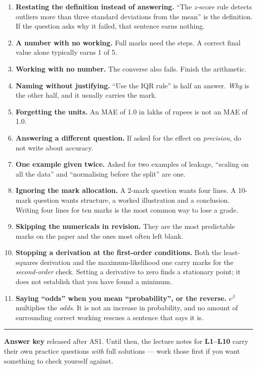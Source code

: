 \documentclass[11pt,a4paper]{article}
\begin{document}
\begin{enumerate}[leftmargin=*, itemsep=0.3em]
\item \textbf{Restating the definition instead of answering.} ``The $z$-score
  rule detects outliers more than three standard deviations from the mean'' is
  the definition. If the question asks why it failed, that sentence earns
  nothing.
\item \textbf{A number with no working.} Full marks need the steps. A correct
  final value alone typically earns 1 of 5.
\item \textbf{Working with no number.} The converse also fails. Finish the
  arithmetic.
\item \textbf{Naming without justifying.} ``Use the IQR rule'' is half an
  answer. \emph{Why} is the other half, and it usually carries the mark.
\item \textbf{Forgetting the units.} An MAE of 1.0 in lakhs of rupees is not an
  MAE of 1.0.
\item \textbf{Answering a different question.} If asked for the effect on
  \emph{precision}, do not write about accuracy.
\item \textbf{One example given twice.} Asked for two examples of leakage,
  ``scaling on all the data'' and ``normalising before the split'' are one.
\item \textbf{Ignoring the mark allocation.} A 2-mark question wants four lines.
  A 10-mark question wants structure, a worked illustration and a conclusion.
  Writing four lines for ten marks is the most common way to lose a grade.
\item \textbf{Skipping the numericals in revision.} They are the most
  predictable marks on the paper and the ones most often left blank.
\item \textbf{Stopping a derivation at the first-order conditions.} Both the
  least-squares derivation and the maximum-likelihood one carry marks for the
  \emph{second-order} check. Setting a derivative to zero finds a stationary
  point; it does not establish that you have found a minimum.
\item \textbf{Saying ``odds'' when you mean ``probability'', or the reverse.}
  $e^{\beta}$ multiplies the \emph{odds}. It is not an increase in probability,
  and no amount of surrounding correct working rescues a sentence that says it
  is.
\end{enumerate}

\vspace{0.5em}\hrule\vspace{0.4em}
\noindent\small\textbf{Answer key} released after AS1. Until then, the lecture
notes for \textbf{L1--L10} carry their own practice questions \emph{with} full
solutions --- work those first if you want something to check yourself
against.\normalsize
\end{document}
